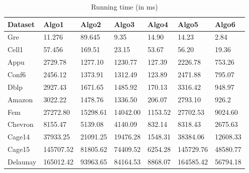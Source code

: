 \begin{table}[th]
\begin{center}
    \begin{tabular}{| l | l | l | l | l | l | l |}
    \hline
	Dataset & Algo1 & Algo2 & Algo3 & Algo4 & Algo5 & Algo6\\ \hline
    \hline
	Gre & 11.276 & 89.645 & 9.35 & 14.90 & 14.23 & \cellcolor{blue!25} 2.84\\ \hline
	Cell1 & 57.456 & 169.51 & 23.15 & 53.67 & 56.20 & \cellcolor{blue!25} 19.36\\ \hline
	Appu & 2729.78 & 1277.10 & 1230.77 & \cellcolor{blue!25} 127.39 & 2226.78 & 753.26\\ \hline
	Conf6 & 2456.12 & 1373.91 & 1312.49 & \cellcolor{blue!25} 123.89 & 2471.88 & 795.07\\ \hline
	Dblp & 2927.43 & 1671.65 & 1485.92 & \cellcolor{blue!25} 170.13 & 3316.42 & 948.97\\ \hline
	Amazon & 3022.22 & 1478.76 & 1336.50 & \cellcolor{blue!25} 206.07 & 2793.10 & 926.2\\ \hline
	Fem & 27272.80 & 15298.61 & 14042.00 & \cellcolor{blue!25} 1153.52 & 27702.53 & 9024.60\\ \hline
	Chevron & 8155.47 & 5139.08 & 4140.09 & \cellcolor{blue!25} 832.14 & 8318.43 & 2675.63\\ \hline
	Cage14 & 37933.25 & 21091.25 & 19476.28 & \cellcolor{blue!25} 1548.31 & 38384.06 & 12608.33\\ \hline
	Cage15 & 145707.52 & 81805.62 & 74409.52 & \cellcolor{blue!25} 6254.28 & 145729.76 & 48580.77\\ \hline
	Delaunay & 165012.42 & 93963.65 & 84164.53 & \cellcolor{blue!25} 8868.07 & 164585.42 & 56794.18\\ \hline
    \end{tabular}
\end{center}
\caption{\capfont Running time (in ms)}
\label{tab:Table4}
\end{table}

